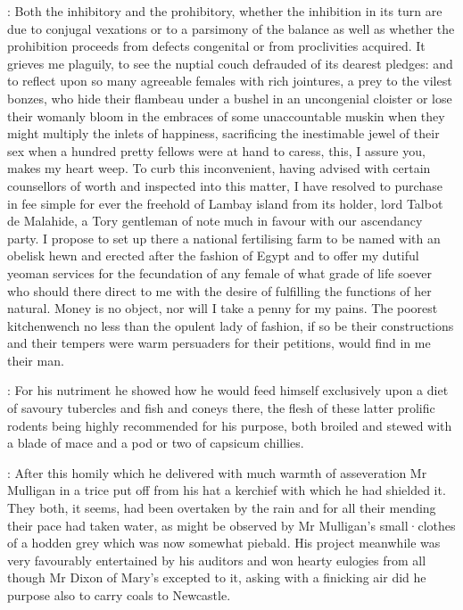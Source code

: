 \mulligan:
Both the inhibitory and the prohibitory,
whether the inhibition in
its turn are due to conjugal vexations
or to a parsimony of the balance as
well as whether the prohibition proceeds from defects congenital or from
proclivities acquired.
It grieves me plaguily,
to see the nuptial couch
defrauded of its dearest pledges:
and to reflect upon so many agreeable
females with rich jointures,
a prey to the vilest bonzes,
who hide their
flambeau under a bushel in an uncongenial cloister or lose their womanly
bloom in the embraces of some unaccountable muskin when they might
multiply the inlets of happiness,
sacrificing the inestimable jewel of
their sex when a hundred pretty fellows were at hand to caress,
this,
I assure you,
makes my heart weep.
To curb this inconvenient,
having advised
with certain counsellors of worth and inspected into this matter,
I have resolved to purchase in fee simple for ever the freehold of Lambay island
from its holder,
lord Talbot de Malahide,
a Tory gentleman of note much in
favour with our ascendancy party.
I propose to set up there a national fertilising farm to be named  with an obelisk hewn and
erected after the fashion of Egypt and to offer my dutiful yeoman services
for the fecundation of any female of what grade of life soever who should
there direct to me with the desire of fulfilling the functions of her natural.
Money is no object,
nor will I take a penny for my pains.
The poorest kitchenwench no less than the opulent lady of fashion,
if so be their constructions and their tempers were warm persuaders for their petitions,
would find in me their man.

:
For his nutriment he showed how he would feed himself exclusively
upon a diet of savoury tubercles and fish and coneys there,
the flesh of these latter prolific rodents being highly recommended for his purpose,
both broiled and stewed with a blade of mace and a pod or two of capsicum chillies.

:
After this homily which he delivered with much warmth of asseveration
Mr Mulligan in a trice put off from his hat a kerchief with which he had shielded it.
They both,
it seems,
had been overtaken by the rain and for all their mending their pace had taken water,
as might be observed by Mr Mulligan's small·clothes of a hodden grey which was now somewhat piebald.
His project meanwhile was very favourably entertained by his auditors and
won hearty eulogies from all though Mr Dixon of Mary's excepted to it,
asking with a finicking air did he purpose also to carry coals to Newcastle.

